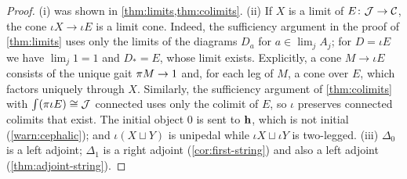 \begin{proof}
(i) was shown in \cref{thm:limits,thm:colimits}. (ii) If $X$ is a limit of
$E\colon\mathcal{J}\to\mathcal{C}$, the cone $\iota X\to\iota E$ is a limit cone. Indeed, the
sufficiency argument in the proof of \cref{thm:limits} uses only the limits of
the diagrams $D_a$ for $a\in\lim_jA_j$; for $D=\iota E$ we have $\lim_j1=1$ and
$D_*=E$, whose limit exists. Explicitly, a cone $M\to\iota E$ consists of the
unique gait $\pi M\to1$ and, for each leg of $M$, a cone over $E$, which
factors uniquely through $X$. Similarly, the sufficiency argument of
\cref{thm:colimits} with $\textstyle\int(\pi\iota E)\cong\mathcal{J}$ connected uses only the
colimit of $E$, so $\iota$ preserves connected colimits that exist. The initial object
$0$ is sent to $\mathbf{h}$, which is not initial (\cref{warn:cephalic}); and
$\iota(X\sqcup Y)$ is unipedal while $\iota X\sqcup\iota Y$ is two-legged.
(iii) $\Delta_0$ is a left adjoint; $\Delta_1$ is a right adjoint
(\cref{cor:first-string}) and also a left adjoint (\cref{thm:adjoint-string}).
\end{proof}
